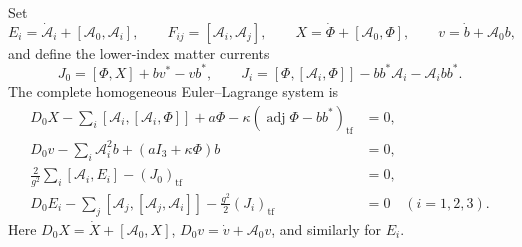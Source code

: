 \begin{proposition}\label{q444:gauge-eom}
Set
\[
 E_i=\dot{\mathcal A}_i+[\mathcal A_0,\mathcal A_i],\qquad
 F_{ij}=[\mathcal A_i,\mathcal A_j],\qquad
 X=\dot\Phi+[\mathcal A_0,\Phi],\qquad v=\dot b+\mathcal A_0b,
\]
and define the lower-index matter currents
\[
 J_0=[\Phi,X]+bv^*-vb^*,\qquad
 J_i=[\Phi,[\mathcal A_i,\Phi]]
                -bb^*\mathcal A_i-\mathcal A_i bb^*.
\]
The complete homogeneous Euler--Lagrange system is
\begin{align}
 D_0X-\sum_i[\mathcal A_i,[\mathcal A_i,\Phi]]
       +a\Phi-\kappa(\operatorname{adj}\Phi-bb^*)_{\mathrm{tf}}&=0,
       \label{q444:gauge-phi}\\
 D_0v-\sum_i\mathcal A_i^2b+(aI_3+\kappa\Phi)b&=0,
       \label{q444:gauge-b}\\
 \frac2{g^2}\sum_i[\mathcal A_i,E_i]-(J_0)_{\mathrm{tf}}&=0,
       \label{q444:full-gauss}\\
 D_0E_i-\sum_j[\mathcal A_j,[\mathcal A_j,\mathcal A_i]]
       -\frac{g^2}{2}(J_i)_{\mathrm{tf}}&=0
       \quad(i=1,2,3). \label{q444:gauge-spatial}
\end{align}
Here $D_0X=\dot X+[\mathcal A_0,X]$,
$D_0v=\dot v+\mathcal A_0v$, and similarly for $E_i$.
\end{proposition}
